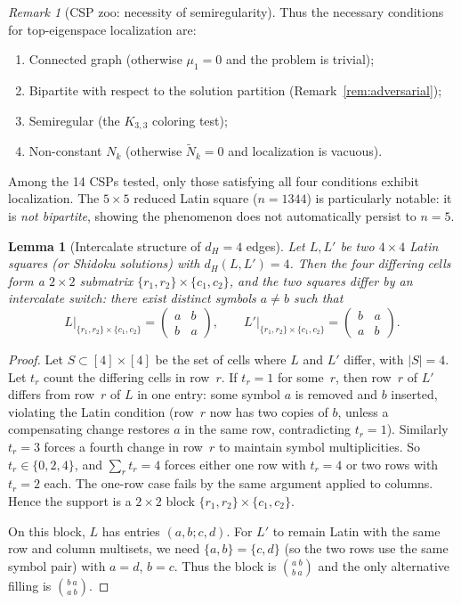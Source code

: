\documentclass[11pt]{article}
\newtheorem{lemma}[theorem]{Lemma}
\theoremstyle{definition}
\theoremstyle{remark}
\newtheorem{remark}[theorem]{Remark}
\begin{document}
\begin{remark}[CSP zoo: necessity of semiregularity]
Thus the necessary conditions for top-eigenspace localization are:
\begin{enumerate}[nosep, label=(\alph*)]
\item Connected graph (otherwise $\mu_1 = 0$ and the problem is trivial);
\item Bipartite with respect to the solution partition (Remark~\ref{rem:adversarial});
\item Semiregular (the $K_{3,3}$ coloring test);
\item Non-constant $N_k$ (otherwise $\tilde{N}_k = 0$ and localization is vacuous).
\end{enumerate}
Among the 14 CSPs tested, only those satisfying all four conditions exhibit localization.  The $5 \times 5$ reduced Latin square ($n = 1344$) is particularly notable: it is \emph{not bipartite}, showing the phenomenon does not automatically persist to $n = 5$.
\end{remark}

\begin{lemma}[Intercalate structure of $d_H = 4$ edges]\label{lem:intercalate}
Let $L, L'$ be two $4 \times 4$ Latin squares (or Shidoku solutions) with $d_H(L, L') = 4$.  Then the four differing cells form a $2 \times 2$ submatrix $\{r_1, r_2\} \times \{c_1, c_2\}$, and the two squares differ by an \emph{intercalate switch}: there exist distinct symbols $a \neq b$ such that
\[
L\big|_{\{r_1,r_2\} \times \{c_1,c_2\}} = \begin{pmatrix} a & b \\ b & a \end{pmatrix}, \qquad
L'\big|_{\{r_1,r_2\} \times \{c_1,c_2\}} = \begin{pmatrix} b & a \\ a & b \end{pmatrix}.
\]
\end{lemma}

\begin{proof}
Let $S \subset [4] \times [4]$ be the set of cells where $L$ and $L'$ differ, with $|S| = 4$.  Let $t_r$ count the differing cells in row~$r$.  If $t_r = 1$ for some~$r$, then row~$r$ of $L'$ differs from row~$r$ of $L$ in one entry: some symbol $a$ is removed and $b$ inserted, violating the Latin condition (row~$r$ now has two copies of $b$, unless a compensating change restores $a$ in the same row, contradicting $t_r = 1$).  Similarly $t_r = 3$ forces a fourth change in row~$r$ to maintain symbol multiplicities.  So $t_r \in \{0, 2, 4\}$, and $\sum_r t_r = 4$ forces either one row with $t_r = 4$ or two rows with $t_r = 2$ each.  The one-row case fails by the same argument applied to columns.  Hence the support is a $2 \times 2$ block $\{r_1, r_2\} \times \{c_1, c_2\}$.

On this block, $L$ has entries $(a, b; c, d)$.  For $L'$ to remain Latin with the same row and column multisets, we need $\{a, b\} = \{c, d\}$ (so the two rows use the same symbol pair) with $a = d$, $b = c$.  Thus the block is $\binom{a\ b}{b\ a}$ and the only alternative filling is $\binom{b\ a}{a\ b}$.
\end{proof}
\end{document}
